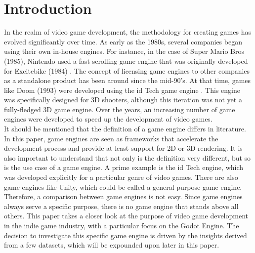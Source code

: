 \section{Introduction}
In the realm of video game development, the methodology for creating games has evolved significantly over time.
As early as the 1980s, several companies began using their own in-house engines.
For instance, in the case of Super Mario Bros (1985), Nintendo used a fast scrolling game engine that was originally developed for Excitebike (1984) \cite{history-digital-games}.
The concept of licensing game engines to other companies as a standalone product has been around since the mid-90's.
At that time, games like Doom (1993) were developed using the id Tech game engine \cite{id-tech-doom}.
This engine was specifically designed for 3D shooters, although this iteration was not yet a fully-fledged 3D game engine.
Over the years, an increasing number of game engines were developed to speed up the development of video games.\\
 
It should be mentioned that the definition of a game engine differs in literature.
In this paper, game engines are seen as frameworks that accelerate the development process and provide at least support for 2D or 3D rendering.
It is also important to understand that not only is the definition very different, but so is the use case of a game engine.
A prime example is the id Tech engine, which was developed explicitly for a particular genre of video games.
There are also game engines like Unity, which could be called a general purpose game engine.
Therefore, a comparison between game engines is not easy.
Since game engines always serve a specific purpose, there is no game engine that stands above all others.
This paper takes a closer look at the purpose of video game development in the indie game industry, with a particular focus on the Godot Engine.
The decision to investigate this specific game engine is driven by the insights derived from a few datasets, which will be expounded upon later in this paper.
